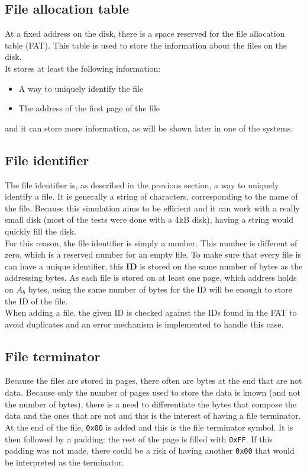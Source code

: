 \documentclass[10pt,a4paper]{ULBreport}
\begin{document}
\subsection{File allocation table}
At a fixed address on the disk, there is a space reserved for the file allocation table (FAT). This table is used to store the information about the files on the disk. \\
It stores at least the following information:
\begin{itemize}
    \item A way to uniquely identify the file
    \item The address of the first page of the file
\end{itemize}
and it can store more information, as will be shown later in one of the systems.
\subsection{File identifier}
The file identifier is, as described in the previous section, a way to uniquely identify a file. It is generally a string of characters, corresponding to the name of the file. Because this simulation aims to be efficient and it can work with a really small disk (most of the tests were done with a 4kB disk), having a string would quickly fill the disk. \\
For this reason, the file identifier is simply a number. This number is different of zero, which is a reserved number for an empty file. To make sure that every file is can have a unique identifier, this \textbf{ID} is stored on the same number of bytes as the addressing bytes. As each file is stored on at least one page, which address holds on $A_b$ bytes, using the same number of bytes for the ID will be enough to store the ID of the file. \\
When adding a file, the given ID is checked against the IDs found in the FAT to avoid duplicates and an error mechanism is implemented to handle this case. 
\subsection{File terminator}
Because the files are stored in pages, there often are bytes at the end that are not data. Because only the number of pages used to store the data is known (and not the number of bytes), there is a need to differentiate the bytes that compose the data and the ones that are not and this is the interest of having a file terminator. \\
At the end of the file, \texttt{0x00} is added and this is the file terminator symbol. It is then followed by a padding: the rest of the page is filled with \texttt{0xFF}. If this padding was not made, there could be a risk of having another \texttt{0x00} that would be interpreted as the terminator.
\end{document}
